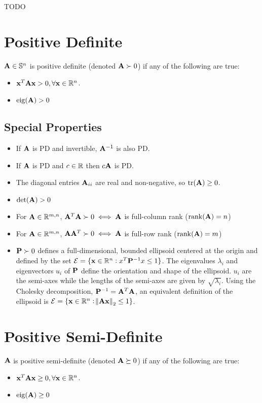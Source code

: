 TODO



\section{Positive Definite}

$\mathbf{A}\in\mathbb{S}^{n}$ is positive definite (denoted $\mathbf{A}\succ0$) if any of the following are true:
\begin{itemize}
\item $\mathbf{x}^T\mathbf{A}\mathbf{x}>0,\forall\mathbf{x}\in\mathbb{R}^{n}$.
\item $\operatorname{eig}(\mathbf{A})>0$
\end{itemize}


\subsection*{Special Properties}

\begin{itemize}
\item If $\mathbf{A}$ is PD and invertible, $\mathbf{A}^{-1}$ is also PD.
\item If $\mathbf{A}$ is PD and $c\in\mathbb{R}$ then $c\mathbf{A}$ is PD.
\item The diagonal entries $\mathbf{A}_{ii}$ are real and non-negative, so $\operatorname{tr}(\mathbf{A})\ge0$. %
\item $\det(\mathbf{A})>0$
\item For $\mathbf{A}\in\mathbb{R}^{m,n}$, $\mathbf{A}^T\mathbf{A}\succ0\iff \mathbf{A}$ is full-column rank ($\operatorname{rank}(\mathbf{A})=n$)
\item For $\mathbf{A}\in\mathbb{R}^{m,n}$, $\mathbf{A}\mathbf{A}^T\succ0\iff \mathbf{A}$ is full-row rank ($\operatorname{rank}(\mathbf{A})=m$)
\item $\mathbf{P}\succ0$ defines a full-dimensional, bounded ellipsoid centered at the origin and defined by the set $\mathcal{E}=\{\mathbf{x}\in\mathbb{R}^{n}: x^T\mathbf{P}^{-1}x\le1\}$. The eigenvalues $\lambda_i$ and eigenvectors $u_i$ of $\mathbf{P}$ define the orientation and shape of the ellipsoid. $u_i$ are the semi-axes while the lengths of the semi-axes are given by $\sqrt{\lambda_i}$. Using the Cholesky decomposition, $\mathbf{P}^{-1}=\mathbf{A}^T\mathbf{A}$, an equivalent definition of the ellipsoid is $\mathcal{E}=\{\mathbf{x}\in\mathbb{R}^{n}: \norm{\mathbf{A}\mathbf{x}}_2\le1\}$.
\end{itemize}

\section{Positive Semi-Definite}

$\mathbf{A}$ is positive semi-definite (denoted $\mathbf{A}\succeq0$) if any of the following are true:
\begin{itemize}
\item $\mathbf{x}^T\mathbf{A}\mathbf{x}\ge0,\forall\mathbf{x}\in\mathbb{R}^{n}$.
\item $\operatorname{eig}(\mathbf{A})\ge0$
\end{itemize}

